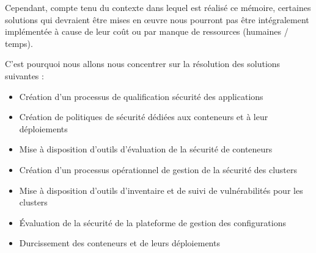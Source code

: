 Cependant, compte tenu du contexte dans lequel est réalisé ce mémoire, certaines solutions qui devraient être mises en 
œuvre nous pourront pas être intégralement implémentée à cause de leur coût ou par manque de ressources (humaines / 
temps).

C'est pourquoi nous allons nous concentrer sur la résolution des solutions suivantes : 
\begin{itemize}
    \item Création d'un processus de qualification sécurité des applications
    \item Création de politiques de sécurité dédiées aux conteneurs et à leur déploiements
    \item Mise à disposition d'outils d'évaluation de la sécurité de conteneurs
    \item Création d'un processus opérationnel de gestion de la sécurité des clusters
    \item Mise à disposition d'outils d'inventaire et de suivi de vulnérabilités pour les clusters
    \item Évaluation de la sécurité de la plateforme de gestion des configurations
    \item Durcissement des conteneurs et de leurs déploiements
\end{itemize}